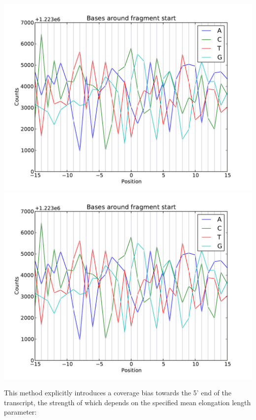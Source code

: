 \begin{center}
\includegraphics[scale=0.6,page=1]{../src/test/pos_bias/pb_pre_prim.pdf}
\\
\includegraphics[scale=0.6,page=2]{../src/test/pos_bias/pb_pre_prim.pdf}
\end{center}

This method explicitly introduces a coverage bias towards the 5' end of the transcript, the strength of which depends on the specified mean elongation length
parameter:

